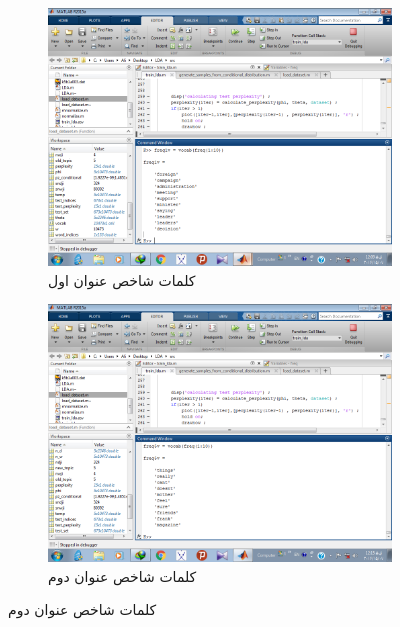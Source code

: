 \documentclass[11.5pt,a4paper]{article}
\begin{document}
\begin{figure}[h]
\center
	\begin{subfigure}{.45\textwidth}
		\includegraphics[scale=0.25]{Imgs/freqk1.png}
		\caption{کلمات شاخص عنوان اول}
	\end{subfigure}
	\begin{subfigure}{.45\textwidth}
		\includegraphics[scale=0.25]{Imgs/freqk2.png}
		\caption{کلمات شاخص عنوان دوم}
	\end{subfigure}


\end{figure}
\end{document}
